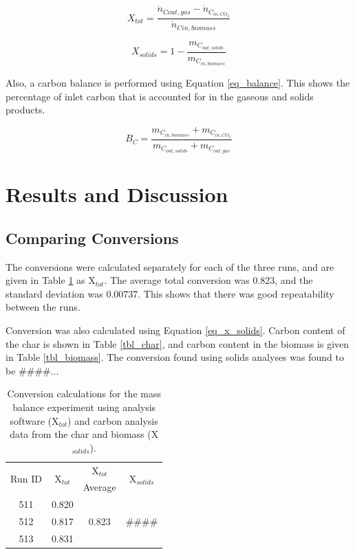 \documentclass[11pt,twocolumn]{article}
\begin{document}
\begin{equation}
	X_{tot} = \frac{\dot{n}_{C out,gas} - \dot{n}_{C_{in,CO_2}}}{\dot{n}_{C in,biomass}}
	\label{eq_total}
\end{equation}

\begin{equation}
	X_{solids} = 1- \frac{m_{C_{out, solids}}}{m_{C_{in, biomass}}}
	\label{eq_x_solids}
\end{equation}

Also, a carbon balance is performed using Equation \ref{eq_balance}.  This shows the percentage of inlet carbon that is accounted for in the gaseous and solids products.

\begin{equation}
	B_C = \frac{m_{C_{in, biomass}} + m_{C_{in, CO_2}}}{m_{C_{out, solids}} + m_{C_{out, gas}}}
	\label{eq_balance}
\end{equation}

\section*{Results and Discussion}

\subsection*{Comparing Conversions}

The conversions were calculated separately for each of the three runs, and are given in Table \ref{conversions} as X$_{tot}$.  The average total conversion was 0.823, and the standard deviation was 0.00737.  This shows that there was good repeatability between the runs.

Conversion was also calculated using Equation \ref{eq_x_solids}.  Carbon content of the char is shown in Table \ref{tbl_char}, and carbon content in the biomass is given in Table \ref{tbl_biomass}.  The conversion found using solids analyses was found to be \#\#\#\#...

\begin{table}
	\centering
	\caption{Conversion calculations for the mass balance experiment using analysis software (X$_{tot}$) and carbon analysis data from the char and biomass (X$_{solids}$).}
	\label{conversions}
	\begin{tabular}{c c c c}
	\toprule
	\multirow{2}{*}{Run ID}	&	\multirow{2}{*}{X$_{tot}$}	& 	X$_{tot}$				&\multirow{2}{*}{X$_{solids}$}	\\ 
	{}					&	{}						& 	Average				&	{}						\\
	\midrule
	511					&	0.820					&	\multirow{3}{*}{0.823}	&	\multirow{3}{*}{\#\#\#\#}	\\
	512					&	0.817					&	{}					&	{}						\\
	513					&	0.831					&	{}					&	{}						\\
	\bottomrule
	\end{tabular}
\end{table}
\end{document}
